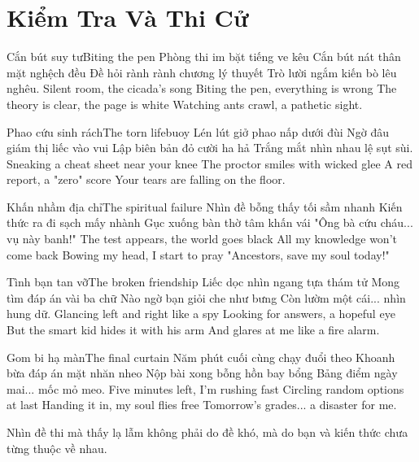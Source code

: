 \chapter{Kiểm Tra Và Thi Cử}

\begin{tutuyetbox}{Cắn bút suy tư}{Biting the pen}
Phòng thi im bặt tiếng ve kêu
Cắn bút nát thân mặt nghệch đều
Đề hỏi rành rành chương lý thuyết
Trò lười ngắm kiến bò lêu nghêu.
\tcblower
Silent room, the cicada's song 
Biting the pen, everything is wrong 
The theory is clear, the page is white 
Watching ants crawl, a pathetic sight.
\end{tutuyetbox}

\begin{tutuyetbox}{Phao cứu sinh rách}{The torn lifebuoy}
Lén lút giở phao nấp dưới đùi
Ngờ đâu giám thị liếc vào vui
Lập biên bản đỏ cười ha hả
Trắng mắt nhìn nhau lệ sụt sùi.
\tcblower
Sneaking a cheat sheet near your knee 
The proctor smiles with wicked glee 
A red report, a "zero" score 
Your tears are falling on the floor.
\end{tutuyetbox}

\begin{tutuyetbox}{Khấn nhầm địa chỉ}{The spiritual failure}
Nhìn đề bỗng thấy tối sầm nhanh
Kiến thức ra đi sạch mấy nhành
Gục xuống bàn thờ tâm khấn vái
"Ông bà cứu cháu... vụ này banh!"
\tcblower
The test appears, the world goes black 
All my knowledge won't come back 
Bowing my head, I start to pray 
"Ancestors, save my soul today!"
\end{tutuyetbox}

\begin{tutuyetbox}{Tình bạn tan vỡ}{The broken friendship}
Liếc dọc nhìn ngang tựa thám tử
Mong tìm đáp án vài ba chữ
Nào ngờ bạn giỏi che như bưng
Còn lườm một cái... nhìn hung dữ.
\tcblower
Glancing left and right like a spy 
Looking for answers, a hopeful eye 
But the smart kid hides it with his arm 
And glares at me like a fire alarm.
\end{tutuyetbox}

\begin{tutuyetbox}{Gom bi hạ màn}{The final curtain}
Năm phút cuối cùng chạy đuổi theo
Khoanh bừa đáp án mặt nhăn nheo
Nộp bài xong bỗng hồn bay bổng
Bảng điểm ngày mai... mốc mỏ meo.
\tcblower
Five minutes left, I’m rushing fast 
Circling random options at last 
Handing it in, my soul flies free 
Tomorrow's grades... a disaster for me.
\end{tutuyetbox}

\begin{ghichu}
Nhìn đề thi mà thấy lạ lẫm không phải do đề khó, mà do bạn và kiến thức chưa từng thuộc về nhau.
\end{ghichu}
